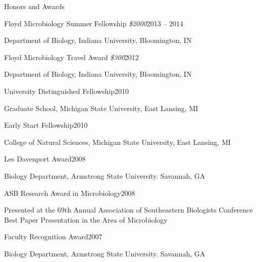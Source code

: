 \documentclass{resume} %
\begin{document}
\begin{rSection}{Honors and Awards}

    \begin{rSubsection}{Floyd Microbiology Summer Fellowship
      {\normalfont \em \$2000}}{2013 -- 2014}{}{}
      \item Department of Biology, Indiana University, Bloomington, IN
    \end{rSubsection}

    \begin{rSubsection}{Floyd Microbiology Travel Award
      {\normalfont \em \$300}}{2012}{}{}
      \item Department of Biology, Indiana University, Bloomington, IN
    \end{rSubsection}

    \begin{rSubsection}{University Distinguished Fellowship}{2010}{}{}
      \item Graduate School, Michigan State University, East Lansing, MI
    \end{rSubsection}

    \begin{rSubsection}{Early Start Fellowship}{2010}{}{}
      \item College of Natural Sciences, Michigan State University, East
      Lansing, MI
    \end{rSubsection}

    \begin{rSubsection}{Les Davenport Award}{2008}{}{}
      \item Biology Department, Armstrong State University. Savannah, GA
    \end{rSubsection}

    \begin{rSubsection}{ASB Research Award in Microbiology}{2008}{}{}
      \item Presented at the 69th Annual Association of Southeastern Biologists
      Conference \\
      Best Paper Presentation in the Area of Microbiology
    \end{rSubsection}

    \begin{rSubsection}{Faculty Recognition Award}{2007}{}{}
      \item Biology Department, Armstrong State University. Savannah, GA
    \end{rSubsection}

\end{rSection}
\end{document}
